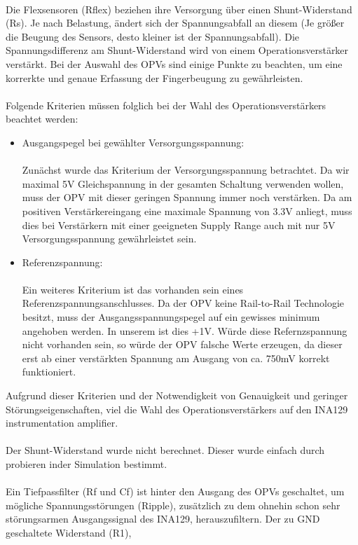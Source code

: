\documentclass[11pt]{article}
\begin{document}
\\
Die Flexsensoren (Rflex) beziehen ihre Versorgung über einen Shunt-Widerstand (Rs). Je nach Belastung, ändert sich der 
Spannungsabfall an diesem (Je größer die Beugung des Sensors, desto kleiner ist der Spannungsabfall). Die Spannungsdifferenz 
am Shunt-Widerstand wird von einem Operationsverstärker verstärkt. Bei der Auswahl des OPVs sind einige Punkte zu beachten, um 
eine korrerkte und genaue Erfassung der Fingerbeugung zu gewährleisten. \\
\\
Folgende Kriterien müssen folglich bei der Wahl des Operationsverstärkers beachtet werden:
\begin{itemize}
	\item Ausgangspegel bei gewählter Versorgungsspannung: \\
		  \\
		  Zunächst wurde das Kriterium der Versorgungsspannung betrachtet. Da wir maximal 5V Gleichspannung in der gesamten 
		  Schaltung verwenden wollen, muss der OPV mit dieser geringen Spannung immer noch verstärken. Da am positiven 
		  Verstärkereingang eine maximale Spannung von 3.3V anliegt, muss dies bei Verstärkern mit einer geeigneten Supply Range 
		  auch mit nur 5V Versorgungsspannung gewährleistet sein.
	\item Referenzspannung: \\
		  \\
		  Ein weiteres Kriterium ist das vorhanden sein eines Referenzspannungsanschlusses. Da der OPV keine Rail-to-Rail 
		  Technologie besitzt, muss der Ausgangsspannungspegel auf ein gewisses minimum angehoben werden. In unserem ist dies 
		  +1V. Würde diese Refernzspannung nicht vorhanden sein, so würde der OPV falsche Werte erzeugen, da dieser erst ab einer
		  verstärkten Spannung am Ausgang von ca. 750mV korrekt funktioniert.

\end{itemize}
Aufgrund dieser Kriterien und der Notwendigkeit von Genauigkeit und geringer Störungseigenschaften, viel die Wahl des 
Operationsverstärkers auf den INA129 instrumentation amplifier. \\
\\
Der Shunt-Widerstand wurde nicht berechnet. Dieser wurde einfach durch probieren inder Simulation bestimmt. \\
\\
Ein Tiefpassfilter (Rf und Cf) ist hinter den Ausgang des OPVs geschaltet, um mögliche Spannungsstörungen (Ripple), zusätzlich
zu dem ohnehin schon sehr störungsarmen Ausgangssignal des INA129, herauszufiltern. Der zu GND geschaltete Widerstand (R1), 
\end{document}
